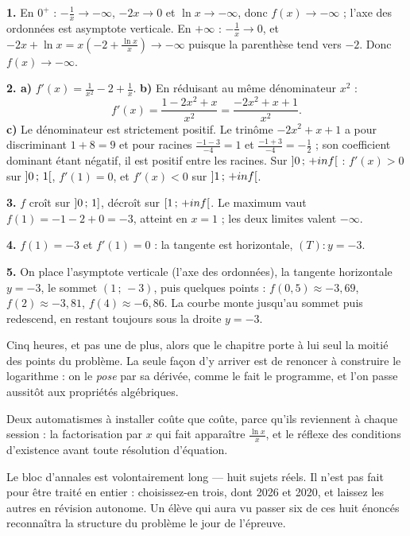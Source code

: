 \begin{corrige}
\textbf{1.} En $0^{+}$ : $-\frac1x \to -\infty$, $-2x \to 0$ et
$\ln x \to -\infty$, donc $f(x) \to -\infty$ ; l'axe des ordonnées est
asymptote verticale. En $+\infty$ : $-\frac1x \to 0$, et
$-2x+\ln x = x\left(-2+\frac{\ln x}{x}\right) \to -\infty$ puisque la
parenthèse tend vers $-2$. Donc $f(x) \to -\infty$.

\textbf{2. a)} $f'(x) = \frac{1}{x^{2}}-2+\frac1x$.
\textbf{b)} En réduisant au même dénominateur $x^{2}$ :
\[
  f'(x) = \frac{1-2x^{2}+x}{x^{2}} = \frac{-2x^{2}+x+1}{x^{2}} .
\]
\textbf{c)} Le dénominateur est strictement positif. Le trinôme
$-2x^{2}+x+1$ a pour discriminant $1+8 = 9$ et pour racines
$\frac{-1-3}{-4} = 1$ et $\frac{-1+3}{-4} = -\frac12$ ; son coefficient
dominant étant négatif, il est positif entre les racines. Sur
$\left]0\,;\,+inf\right[$ : $f'(x)>0$ sur $\left]0\,;\,1\right[$,
$f'(1) = 0$, et $f'(x)<0$ sur $\left]1\,;\,+inf\right[$.

\textbf{3.} $f$ croît sur $\left]0\,;\,1\right]$, décroît sur
$\left[1\,;\,+inf\right[$. Le maximum vaut
$f(1) = -1-2+0 = -3$, atteint en $x = 1$ ; les deux limites valent
$-\infty$.

\textbf{4.} $f(1) = -3$ et $f'(1) = 0$ : la tangente est horizontale,
$(T) : y = -3$.

\textbf{5.} On place l'asymptote verticale (l'axe des ordonnées), la
tangente horizontale $y = -3$, le sommet $(1\,;\,-3)$, puis quelques
points : $f(0{,}5) \approx -3{,}69$, $f(2) \approx -3{,}81$,
$f(4) \approx -6{,}86$. La courbe monte jusqu'au sommet puis redescend, en
restant toujours sous la droite $y = -3$.
\end{corrige}

\begin{notepourlaclasse}
Cinq heures, et pas une de plus, alors que le chapitre porte à lui seul la
moitié des points du problème. La seule façon d'y arriver est de renoncer à
construire le logarithme : on le \emph{pose} par sa dérivée, comme le fait le
programme, et l'on passe aussitôt aux propriétés algébriques.

Deux automatismes à installer coûte que coûte, parce qu'ils reviennent à
chaque session : la factorisation par $x$ qui fait apparaître
$\frac{\ln x}{x}$, et le réflexe des conditions d'existence avant toute
résolution d'équation.

Le bloc d'annales est volontairement long — huit sujets réels. Il n'est pas
fait pour être traité en entier : choisissez-en trois, dont 2026 et 2020, et
laissez les autres en révision autonome. Un élève qui aura vu passer six de
ces huit énoncés reconnaîtra la structure du problème le jour de l'épreuve.
\end{notepourlaclasse}
